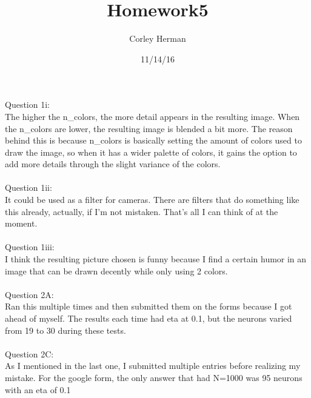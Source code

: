 \documentclass[a4paper]{article}
\title{Homework5}
\author{Corley Herman}
\date{11/14/16}
\begin{document}
\lstset{language=Python}

\maketitle

\noindent Question 1i:\\
The higher the n\_colors, the more detail appears in the resulting image. When the n\_colors are lower, the resulting image is blended a bit more. The reason behind this is because n\_colors is basically setting the amount of colors used to draw the image, so when it has a wider palette of colors, it gains the option to add more details through the slight variance of the colors.\\
\\
Question 1ii:\\
It could be used as a filter for cameras. There are filters that do something like this already, actually, if I'm not mistaken. That's all I can think of at the moment.\\
\\
Question 1iii:\\
I think the resulting picture chosen is funny because I find a certain humor in an image that can be drawn decently while only using 2 colors.\\
\\
Question 2A:\\
Ran this multiple times and then submitted them on the forms because I got ahead of myself. The results each time had eta at 0.1, but the neurons varied from 19 to 30 during these tests.\\
\\
Question 2C:\\
As I mentioned in the last one, I submitted multiple entries before realizing my mistake. For the google form, the only answer that had N=1000 was 95 neurons with an eta of 0.1\\
\\
\end{document}
